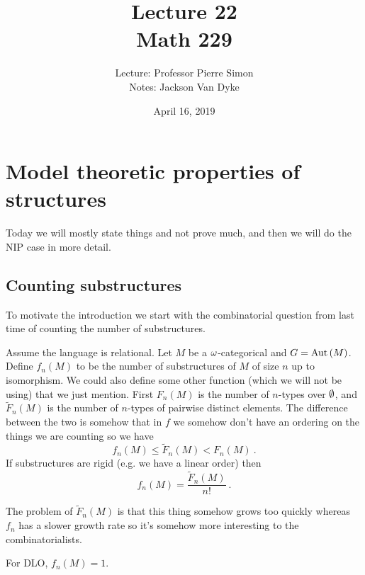 \documentclass{amsart}
\begin{document}
\title{Lecture 22\\ Math 229}
\author{Lecture: Professor Pierre Simon\\ Notes: Jackson Van Dyke}
\date{April 16, 2019}
\maketitle

\section{Model theoretic properties of structures}

Today we will mostly state things and not prove much, and then we will do the NIP case in
more detail. 

\subsection{Counting substructures}

To motivate the introduction we start with the combinatorial question from last time of
counting the number of substructures.

Assume the language is relational.
Let $M$ be a $\omega$-categorical and $G = \operatorname{Aut}\left(M\right)$. 
Define $f_n\left(M\right)$ to be the number of substructures of $M$ of size $n$ up to
isomorphism. We could also define some other function (which we will not be using) that we
just mention. First $F_n\left(M\right)$ is the number of $n$-types over $\emptyset$, and
$\tilde F_n\left(M\right)$ is the number of $n$-types of pairwise distinct elements.
The difference between the two is somehow that
in $f$ we somehow don't have an ordering on the things we are counting so we have
\begin{equation}
f_n\left(M\right) \leq \tilde F_n\left(M\right) < F_n\left(M\right) \ .
\end{equation}
If substructures are rigid (e.g. we have a linear order) then 
\begin{equation}
f_n\left(M\right) = \frac{\tilde F_n\left(M\right)}{n!}\ .
\end{equation}

The problem of $\tilde F_n\left(M\right)$ is that this thing somehow grows too quickly
whereas $f_n$ has a slower growth rate so it's somehow more interesting to the
combinatorialists. 

\begin{exm}
For DLO, $f_n\left(M\right) = 1$.
\end{exm}
\end{document}
